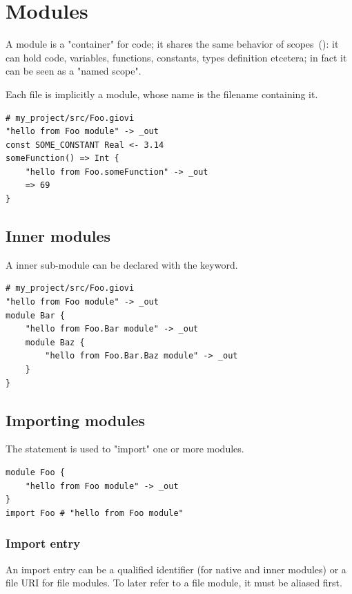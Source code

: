 \chapter{Modules}
\label{ch:modules}

A module is a "container" for code; it shares the same behavior of
scopes~(): it can hold code, variables, functions, constants,
types definition etcetera; in fact it can be seen as a "named scope".

Each file is implicitly a module, whose name is the filename containing it.

\begin{verbatim}
# my_project/src/Foo.giovi
"hello from Foo module" -> _out
const SOME_CONSTANT Real <- 3.14
someFunction() => Int {
	"hello from Foo.someFunction" -> _out
	=> 69
}
\end{verbatim}

\section{Inner modules}

A inner sub-module can be declared with the  keyword.

\begin{verbatim}
# my_project/src/Foo.giovi
"hello from Foo module" -> _out
module Bar {
	"hello from Foo.Bar module" -> _out
	module Baz {
		"hello from Foo.Bar.Baz module" -> _out
	}
}
\end{verbatim}


\section{Importing modules}
\label{sec:import}

The  statement is used to "import" one or more modules.

\begin{verbatim}
module Foo {
	"hello from Foo module" -> _out
}
import Foo # "hello from Foo module"
\end{verbatim}

\subsection{Import entry}

An import entry can be a qualified identifier (for native and inner modules) or
a file URI for file modules. To later refer to a file module, it must be
aliased first.

